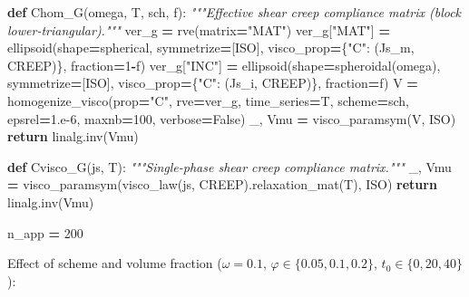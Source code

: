 \documentclass[
  a4paper,
  numbers=noendperiod,
  DIV=12]{scrreprt}
\newenvironment{Shaded}{\begin{snugshade}}{\end{snugshade}}
\newcommand{\CommentTok}[1]{\textcolor[rgb]{0.56,0.35,0.01}{\textit{#1}}}
\newcommand{\ControlFlowTok}[1]{\textcolor[rgb]{0.13,0.29,0.53}{\textbf{#1}}}
\newcommand{\DecValTok}[1]{\textcolor[rgb]{0.00,0.00,0.81}{#1}}
\newcommand{\FloatTok}[1]{\textcolor[rgb]{0.00,0.00,0.81}{#1}}
\newcommand{\KeywordTok}[1]{\textcolor[rgb]{0.13,0.29,0.53}{\textbf{#1}}}
\newcommand{\NormalTok}[1]{#1}
\newcommand{\OperatorTok}[1]{\textcolor[rgb]{0.81,0.36,0.00}{\textbf{#1}}}
\newcommand{\StringTok}[1]{\textcolor[rgb]{0.31,0.60,0.02}{#1}}
\newcommand{\VariableTok}[1]{\textcolor[rgb]{0.00,0.00,0.00}{#1}}
\begin{document}
\begin{Shaded}
\begin{Highlighting}[]
\KeywordTok{def}\NormalTok{ Chom\_G(omega, T, sch, f):}
    \CommentTok{"""Effective shear creep compliance matrix (block lower{-}triangular)."""}
\NormalTok{    ver\_g }\OperatorTok{=}\NormalTok{ rve(matrix}\OperatorTok{=}\StringTok{"MAT"}\NormalTok{)}
\NormalTok{    ver\_g[}\StringTok{"MAT"}\NormalTok{] }\OperatorTok{=}\NormalTok{ ellipsoid(shape}\OperatorTok{=}\NormalTok{spherical,      symmetrize}\OperatorTok{=}\NormalTok{[ISO],}
\NormalTok{                              visco\_prop}\OperatorTok{=}\NormalTok{\{}\StringTok{"C"}\NormalTok{: (Js\_m, CREEP)\}, fraction}\OperatorTok{=}\DecValTok{1}\OperatorTok{{-}}\NormalTok{f)}
\NormalTok{    ver\_g[}\StringTok{"INC"}\NormalTok{] }\OperatorTok{=}\NormalTok{ ellipsoid(shape}\OperatorTok{=}\NormalTok{spheroidal(omega), symmetrize}\OperatorTok{=}\NormalTok{[ISO],}
\NormalTok{                              visco\_prop}\OperatorTok{=}\NormalTok{\{}\StringTok{"C"}\NormalTok{: (Js\_i, CREEP)\}, fraction}\OperatorTok{=}\NormalTok{f)}
\NormalTok{    V }\OperatorTok{=}\NormalTok{ homogenize\_visco(prop}\OperatorTok{=}\StringTok{"C"}\NormalTok{, rve}\OperatorTok{=}\NormalTok{ver\_g, time\_series}\OperatorTok{=}\NormalTok{T,}
\NormalTok{                         scheme}\OperatorTok{=}\NormalTok{sch, epsrel}\OperatorTok{=}\FloatTok{1.e{-}6}\NormalTok{, maxnb}\OperatorTok{=}\DecValTok{100}\NormalTok{, verbose}\OperatorTok{=}\VariableTok{False}\NormalTok{)}
\NormalTok{    \_, Vmu }\OperatorTok{=}\NormalTok{ visco\_paramsym(V, ISO)}
    \ControlFlowTok{return}\NormalTok{ linalg.inv(Vmu)}

\KeywordTok{def}\NormalTok{ Cvisco\_G(js, T):}
    \CommentTok{"""Single{-}phase shear creep compliance matrix."""}
\NormalTok{    \_, Vmu }\OperatorTok{=}\NormalTok{ visco\_paramsym(visco\_law(js, CREEP).relaxation\_mat(T), ISO)}
    \ControlFlowTok{return}\NormalTok{ linalg.inv(Vmu)}

\NormalTok{n\_app }\OperatorTok{=} \DecValTok{200}
\end{Highlighting}
\end{Shaded}

Effect of scheme and volume fraction (\(\omega=0.1\),
\(\varphi\in\{0.05,0.1,0.2\}\), \(t_0\in\{0,20,40\}\)):
\end{document}
